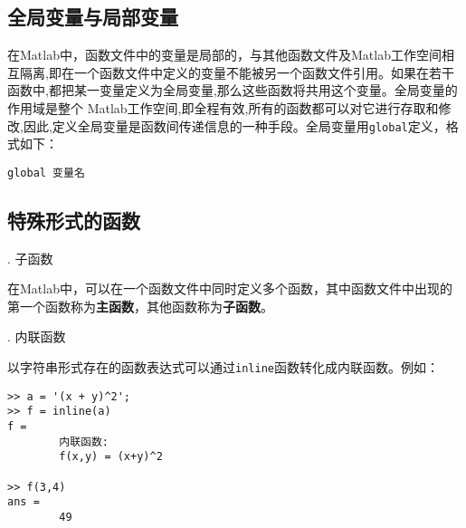 \vspace*{0.5em}
\subsection{全局变量与局部变量}

在Matlab中，函数文件中的变量是局部的，与其他函数文件及Matlab工作空间相互隔离,即在一个函数文件中定义的变量不能被另一个函数文件引用。如果在若干函数中,都把某一变量定义为全局变量,那么这些函数将共用这个变量。全局变量的作用域是整个 Matlab工作空间,即全程有效,所有的函数都可以对它进行存取和修改,因此,定义全局变量是函数间传递信息的一种手段。全局变量用\lstinline|global|定义，格式如下：
\begin{center}
	\lstinline|global 变量名|
\end{center}

\subsection{特殊形式的函数}
. 子函数
\par 在Matlab中，可以在一个函数文件中同时定义多个函数，其中函数文件中出现的第一个函数称为\textbf{主函数}，其他函数称为\textbf{子函数}。

. 内联函数
\par 以字符串形式存在的函数表达式可以通过\lstinline|inline|函数转化成内联函数。例如：
\begin{lstlisting}
>> a = '(x + y)^2';
>> f = inline(a)
f =
		内联函数:
		f(x,y) = (x+y)^2

>> f(3,4)
ans =
		49
\end{lstlisting}






